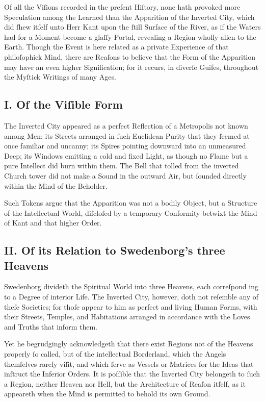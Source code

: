 \documentclass[12pt]{article}
\begin{document}
Of all the Viſions recorded in the prefent Hiſtory, none hath provoked more 
Speculation among the Learned than the Apparition of the Inverted City, 
which did ſhew itſelf unto Herr Kant upon the ſtill Surface of the River, as 
if the Waters had for a Moment become a glaſſy Portal, revealing a Region 
wholly alien to the Earth. Though the Event is here related as a private 
Experience of that philoſophick Mind, there are Reaſons to believe that the 
Form of the Apparition may have an even higher Signification; for it 
recurs, in diverſe Guifes, throughout the Myſtick Writings of many Ages.

\subsection*{I. Of the Viſible Form}
The Inverted City appeared as a perfect Reflection of a Metropolis not known 
among Men: its Streets arranged in ſuch Euclidean Purity that they ſeemed at 
once familiar and uncanny; its Spires pointing downward into an unmeasured 
Deep; its Windows emitting a cold and fixed Light, as though no Flame but a 
pure Intellect did burn within them. The Bell that tolled from the inverted 
Church tower did not make a Sound in the outward Air, but ſounded directly 
within the Mind of the Beholder.

Such Tokens argue that the Apparition was not a bodily Object, but a 
Struc­ture of the Intellectual World, diſcloſed by a temporary Conformity 
betwixt the Mind of Kant and that higher Order.

\subsection*{II. Of its Relation to Swedenborg’s three Heavens}
Swedenborg divideth the Spiritual World into three Heavens, each correſpond­
ing to a Degree of interior Life. The Inverted City, however, doth not 
reſemble any of theſe Societies; for thoſe appear to him as perfect and 
living Human Forms, with their Streets, Temples, and Habitations arranged in 
accordance with the Loves and Truths that inform them.

Yet he begrudgingly acknowledgeth that there exist Regions not of the 
Heavens properly ſo called, but of the intellectual Border­land, which the 
Angels themſelves rarely viſit, and which ſerve as Vessels or Matrices for 
the Ideas that inſtruct the Inferior Orders. It is poſſible that the Inverted 
City belongeth to ſuch a Region, neither Heaven nor Hell, but the Archi­tecture 
of Reaſon itſelf, as it appeareth when the Mind is permitted to behold its 
own Ground.
\end{document}
